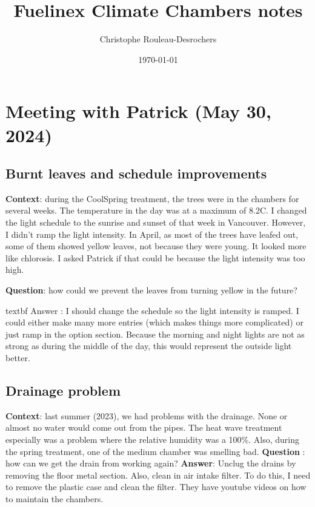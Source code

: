 \documentclass[11pt]{article}
\title{Fuelinex Climate Chambers notes}
\author{Christophe Rouleau-Desrochers }
\date{\today}
\begin{document}
\maketitle	
\pagebreak



\section{Meeting with Patrick (May 30, 2024)}
\subsection {Burnt leaves and schedule improvements}
\textbf{Context}: during the CoolSpring treatment, the trees were in the chambers for several weeks. The temperature in the day was at a maximum of 8.2C. I changed the light schedule to the sunrise and sunset of that week in Vancouver. However, I didn't ramp the light intensity. In April, as most of the trees have leafed out, some of them showed yellow leaves, not because they were young. It looked more like chlorosis. I asked Patrick if that could be because the light intensity was too high.
\par \textbf {Question}: how could we prevent the leaves from turning yellow in the future? 
\par textbf  {Answer} : I should change the schedule so the light intensity is ramped. I could either make many more entries (which makes things more complicated) or just ramp in the option section. Because the morning and night lights are not as strong as during the middle of the day, this would represent the outside light better.
\subsection {Drainage problem}
\textbf{Context}: last summer (2023), we had problems with the drainage. None or almost no water would come out from the pipes. The heat wave treatment especially was a problem where the relative humidity was a 100\%. Also, during the spring treatment, one of the medium chamber was smelling bad.
\textbf{Question} : how can we get the drain from working again?
\textbf{Answer}: Unclug the drains by removing the floor metal section. Also, clean in air intake filter. To do this, I need to remove the plastic case and clean the filter. They have youtube videos on how to maintain the chambers.
\end{document}
